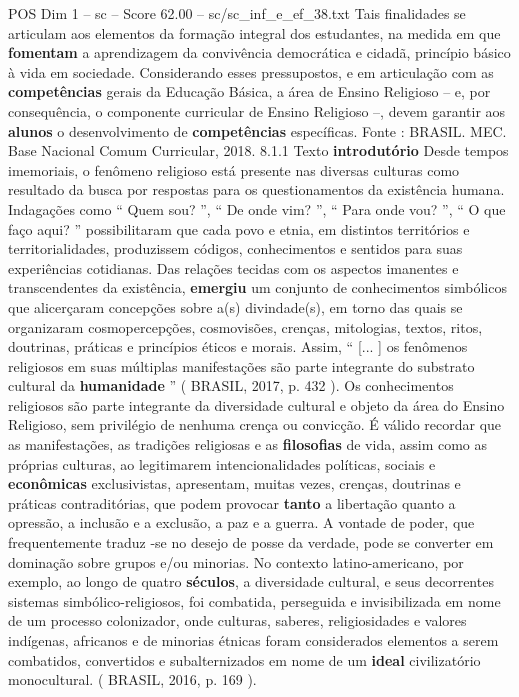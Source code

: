 \begin{textsample}{POS Dim 1 – sc – Score 62.00 – sc/sc\_inf\_e\_ef\_38.txt}
Tais finalidades se articulam aos elementos da formação integral dos estudantes, na medida em que \textbf{fomentam} a aprendizagem da convivência democrática e cidadã, princípio básico à vida em sociedade.
Considerando esses pressupostos, e em articulação com as \textbf{competências} gerais da Educação Básica, a área de Ensino Religioso – e, por consequência, o componente curricular de Ensino Religioso –, devem garantir aos \textbf{alunos} o desenvolvimento de \textbf{competências} específicas.
Fonte : BRASIL.
MEC.
Base Nacional Comum Curricular, 2018. 8.1.1 Texto \textbf{introdutório} Desde tempos imemoriais, o fenômeno religioso está presente nas diversas culturas como resultado da busca por respostas para os questionamentos da existência humana.
Indagações como “ Quem sou? ”, “ De onde vim? ”, “ Para onde vou? ”, “ O que faço aqui? ” possibilitaram que cada povo e etnia, em distintos territórios e territorialidades, produzissem códigos, conhecimentos e sentidos para suas experiências cotidianas.
Das relações tecidas com os aspectos imanentes e transcendentes da existência, \textbf{emergiu} um conjunto de conhecimentos simbólicos que alicerçaram concepções sobre a(s) divindade(s), em torno das quais se organizaram cosmopercepções, cosmovisões, crenças, mitologias, textos, ritos, doutrinas, práticas e princípios éticos e morais.
Assim, “ [... ] os fenômenos religiosos em suas múltiplas manifestações são parte integrante do substrato cultural da \textbf{humanidade} ” ( BRASIL, 2017, p. 432 ).
Os conhecimentos religiosos são parte integrante da diversidade cultural e objeto da área do Ensino Religioso, sem privilégio de nenhuma crença ou convicção.
É válido recordar que as manifestações, as tradições religiosas e as \textbf{filosofias} de vida, assim como as próprias culturas, ao legitimarem intencionalidades políticas, sociais e \textbf{econômicas} exclusivistas, apresentam, muitas vezes, crenças, doutrinas e práticas contraditórias, que podem provocar \textbf{tanto} a libertação quanto a opressão, a inclusão e a exclusão, a paz e a guerra.
A vontade de poder, que frequentemente traduz -se no desejo de posse da verdade, pode se converter em dominação sobre grupos e/ou minorias.
No contexto latino-americano, por exemplo, ao longo de quatro \textbf{séculos}, a diversidade cultural, e seus decorrentes sistemas simbólico-religiosos, foi combatida, perseguida e invisibilizada em nome de um processo colonizador, onde culturas, saberes, religiosidades e valores indígenas, africanos e de minorias étnicas foram considerados elementos a serem combatidos, convertidos e subalternizados em nome de um \textbf{ideal} civilizatório monocultural. ( BRASIL, 2016, p. 169 ).

\end{textsample}
